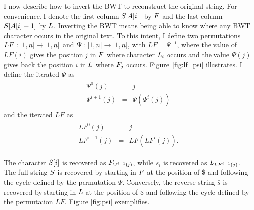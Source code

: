 I now describe how to invert the BWT to reconstruct the original string.
For convenience, I denote the first column $S[A[i]]$ by $F$ and the last column $S[A[i]-1]$ by $L$.
Inverting the BWT means being able to know where any BWT character occurs in the original text.
To this intent, I define two permutations $LF : [1,n] \rightarrow [1,n]$ and $\Psi : [1,n] \rightarrow [1,n]$, with $LF = \Psi^{-1}$, where the value of $LF(i)$ gives the position $j$ in $F$ where character $L_i$ occurs and the value $\Psi(j)$ gives back the position $i$ in $L$ where $F_j$ occurs.
Figure~\ref{fig:lf_psi} illustrates.
I define the iterated $\Psi$ as
\begin{eqnarray}
\begin{array}{lcl}
\Psi^0(j)     &=& j\\
\Psi^{i+1}(j) &=& \Psi(\Psi^{i}(j))
\end{array}
\end{eqnarray}
and the iterated $LF$ as
\begin{eqnarray}
\begin{array}{lcl}
LF^0(j)     &=& j\\
LF^{i+1}(j) &=& LF(LF^{i}(j)).
\end{array}
\end{eqnarray}


The character $S[i]$ is recovered as $F_{\Psi^{i-1}(j)}$, while $\bar{s}_i$ is recovered as $L_{LF^{i-1}(j)}$.
The full string $S$ is recovered by starting in $F$ at the position of \$ and following the cycle defined by the permutation $\Psi$.
Conversely, the reverse string $\bar{s}$ is recovered by starting in $L$ at the position of \$ and following the cycle defined by the permutation $LF$.
Figure \ref{fig:psi} exemplifies.

